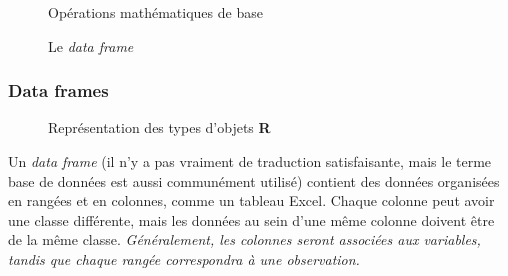 \documentclass[10.5pt,a4paper]{article}
\begin{document}
    \begin{figure}[H]
    \centering
    \caption{Opérations mathématiques de base}
    \label{struVec2}
    \end{figure}
    
    \begin{figure}[H]
    \centering
    \caption{Le \emph{data frame}}
    \label{struDataF}
    \end{figure}
    
    
    \subsubsection{Data frames}
    
    \begin{figure}
      \centering
      \caption{Représentation des types d'objets \textbf{R}}
      \label{lego}
    \end{figure}
    
    Un \emph{data frame} (il n'y a pas vraiment de traduction satisfaisante, mais le terme base de données est aussi communément utilisé) contient des données organisées en rangées et en colonnes, comme un tableau Excel. Chaque colonne peut avoir une classe différente, mais les données au sein d’une même colonne doivent être de la même classe. \emph{Généralement, les colonnes seront associées aux variables, tandis que chaque rangée correspondra à une observation.}
    
\end{document}
